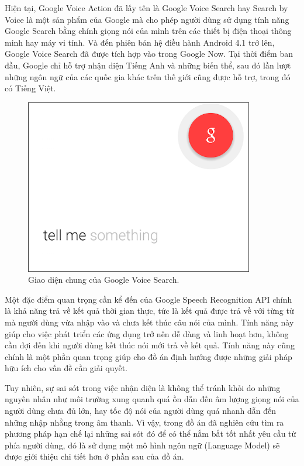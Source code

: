 \documentclass[12pt]{report}
\begin{document}
Hiện tại, Google Voice Action đã lấy tên là Google Voice Search hay Search by Voice là một sản phẩm của Google mà cho phép người dùng sử dụng tính năng Google Search bằng chính giọng nói của mình trên các thiết bị điện thoại thông minh hay máy vi tính. Và đến phiên bản hệ điều hành Android 4.1 trở lên, Google Voice Search đã được tích hợp vào trong Google Now. Tại thời điểm ban đầu, Google chỉ hỗ trợ nhận diện Tiếng Anh và những biến thể, sau đó lần lượt những ngôn ngữ của các quốc gia khác trên thế giới cũng được hỗ trợ, trong đó có Tiếng Việt.

\begin{figure}[H]
  \centering
    \includegraphics[width=10cm]{Pics/Chap2/google-voice.png}
  \caption{Giao diện chung của Google Voice Search\cite{guiding-tech}.}
\end{figure}

Một đặc điểm quan trọng cần kể đến của Google Speech Recognition API chính là khả năng trả về kết quả thời gian thực, tức là kết quả được trả về với từng từ mà người dùng vừa nhập vào và chưa kết thúc câu nói của mình. Tính năng này giúp cho việc phát triển các ứng dụng trở nên dễ dàng và linh hoạt hơn, không cần đợi đến khi người dùng kết thúc nói mới trả về kết quả. Tính năng này cũng chính là một phần quan trọng giúp cho đồ án định hướng được những giải pháp hữu ích cho vấn đề cần giải quyết.

Tuy nhiên, sự sai sót trong việc nhận diện là không thể tránh khỏi do những nguyên nhân như môi trường xung quanh quá ồn dẫn đến âm lượng giọng nói của người dùng chưa đủ lớn, hay tốc độ nói của người dùng quá nhanh dẫn đến những nhập nhằng trong âm thanh. Vì vậy, trong đồ án đã nghiên cứu tìm ra phương pháp hạn chế lại những sai sót đó để có thể nắm bắt tốt nhất yêu cầu từ phía người dùng, đó là sử dụng một mô hình ngôn ngữ (Language Model) sẽ được giới thiệu chi tiết hơn ở phần sau của đồ án.
\end{document}
